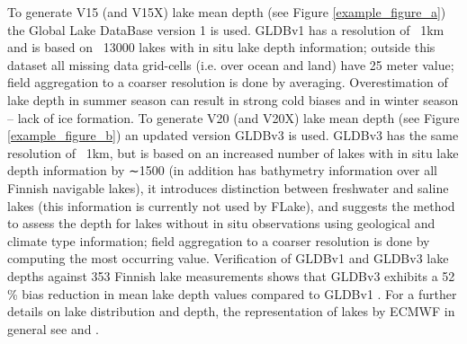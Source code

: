 \documentclass[hess, twostagejnl]{copernicus}
\begin{document}
\noindent To generate V15 (and V15X) lake mean depth (see Figure \ref{example_figure_a}) the Global Lake DataBase version 1 \citep[GLDBv1;][]{Kourzeneva2012} is used. GLDBv1 has a resolution of ~1km and is based on ~13000 lakes with in situ lake depth information; outside this dataset all missing data grid-cells (i.e. over ocean and land) have 25 meter value; field aggregation to a coarser resolution is done by averaging. Overestimation of lake depth in summer season can result in strong cold biases and in winter season – lack of ice formation. To generate V20 (and V20X) lake mean depth (see Figure \ref{example_figure_b}) an updated version GLDBv3 \citep{Choulga2014} is used. GLDBv3 has the same resolution of ~1km, but is based on an increased number of lakes with in situ lake depth information by ∼1500 (in addition has bathymetry information over all Finnish navigable lakes), it introduces distinction between freshwater and saline lakes (this information is currently not used by FLake), and suggests the method to assess the depth for lakes without in situ observations using geological and climate type information; field aggregation to a coarser resolution is done by computing the most occurring value. Verification of GLDBv1 and GLDBv3 lake depths against 353 Finnish lake measurements shows that GLDBv3 exhibits a 52 \% bias reduction in mean lake depth values compared to GLDBv1 \citep{Choulga2019}. For a further details on lake distribution and depth, the representation of lakes by ECMWF in general see \cite{Choulga2019}  and \cite{Boussetta2021}. \newline 
\end{document}
